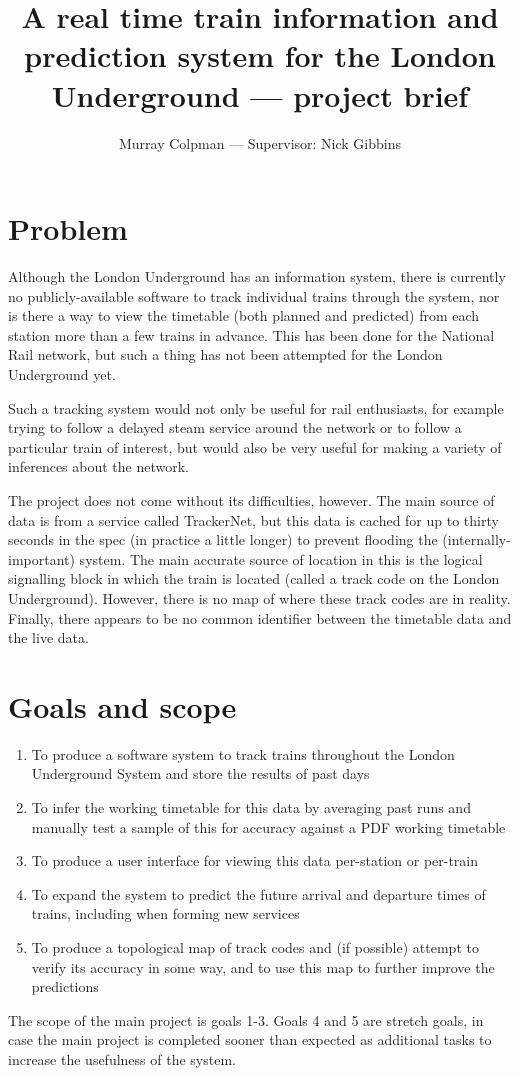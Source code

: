 \documentclass[a4paper,12pt]{article}
\title{A real time train information and prediction system for the London Underground --- project brief}
\author{Murray Colpman --- Supervisor: Nick Gibbins}
\begin{document}
\maketitle

\section*{Problem}

Although the London Underground has an information system, there is currently
no publicly-available software to track individual trains through the system,
nor is there a way to view the timetable (both planned and predicted) from each
station more than a few trains in advance. This has been done for the National
Rail network, but such a thing has not been attempted for the London
Underground yet.

Such a tracking system would not only be useful for rail enthusiasts, for
example trying to follow a delayed steam service around the network or to
follow a particular train of interest, but would also be very useful for making
a variety of inferences about the network.

The project does not come without its difficulties, however. The main source of
data is from a service called TrackerNet, but this data is cached for up to
thirty seconds in the spec (in practice a little longer) to prevent flooding
the (internally-important) system. The main accurate source of location in this
is the logical signalling block in which the train is located (called a track
code on the London Underground). However, there is no map of where these track
codes are in reality. Finally, there appears to be no common identifier between
the timetable data and the live data.

\section*{Goals and scope}

\begin{enumerate}
  \item To produce a software system to track trains throughout the London
    Underground System and store the results of past days
  \item To infer the working timetable for this data by averaging past runs and
    manually test a sample of this for accuracy against a PDF working timetable
  \item To produce a user interface for viewing this data per-station or
    per-train
  \item To expand the system to predict the future arrival and departure times
    of trains, including when forming new services
  \item To produce a topological map of track codes and (if possible) attempt
    to verify its accuracy in some way, and to use this map to further improve
    the predictions
\end{enumerate}

The scope of the main project is goals 1-3. Goals 4 and 5 are stretch goals, in
case the main project is completed sooner than expected as additional tasks to
increase the usefulness of the system.
\end{document}
